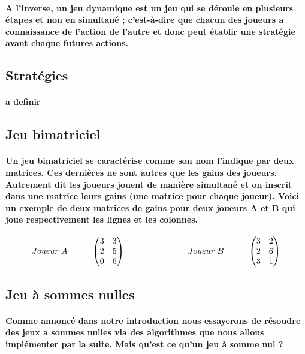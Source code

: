\documentclass[a4paper, 12pt, twoside]{article}
\begin{document}
\paragraph{A l'inverse, un jeu dynamique est un jeu qui se déroule en plusieurs étapes et non en simultané ; c'est-à-dire que chacun des joueurs a connaissance de l'action de l'autre et donc peut établir une stratégie avant chaque futures actions.  }
\subsection{Stratégies}
\paragraph{a definir}
\subsection{Jeu bimatriciel}
\paragraph{Un jeu bimatriciel se caractérise comme son nom l'indique par deux matrices. Ces dernières ne sont autres que les gains des joueurs. Autrement dit les joueurs jouent de manière simultané et on inscrit dans une matrice leurs gains (une matrice pour chaque joueur). Voici un exemple de deux matrices de gains pour deux joueurs A et B qui joue respectivement les lignes et les colonnes.}

\[
Joueur\hspace{0,1cm} A\hspace{1cm}
\begin{pmatrix}3&3\\
2&5\\
0&6\\
\end{pmatrix}\                      \hspace{2,5cm}  
Joueur\hspace{0,1cm} B \hspace{1cm}  
\begin{pmatrix}3&2\\
2&6\\
3&1\\
\end{pmatrix} 
\]
\subsection{Jeu à sommes nulles}
\paragraph{Comme annoncé dans notre introduction nous essayerons de résoudre des jeux a sommes nulles via des algorithmes que nous allons implémenter par la suite. Mais qu'est ce qu'un jeu à somme nul ? }
\end{document}
